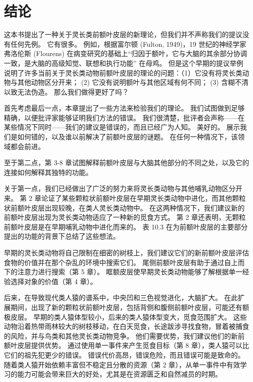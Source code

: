 \section{结论}
这本书提出了一种关于灵长类前额叶皮层的新理论，但我们并不声称我们的提议没有任何先例。 它有很多。 例如，根据富尔顿 (Fulton, 1949)，19 世纪的神经学家弗洛伦斯 (Flourens) 在病变研究的基础上“归因于额叶，它与大脑的其余部分协调一致，是大脑的高级知觉、联想和执行功能” 在母鸡。 但是这个早期的提议举例说明了许多当前关于灵长类动物前额叶皮层的理论的问题：（1）它没有将灵长类动物与其他动物区分开来； (2) 它没有说明额叶与其他区域有何不同； (3) 含糊不清以致无法伪造。 那么我们做得更好了吗？
\par 
首先考虑最后一点，本章提出了一些方法来检验我们的理论。 我们试图做到足够精确，以便批评家能够证明我们方法的错误。 我们很清楚，批评者会声称——在某些情况下同时——我们的建议是错误的，而且已经广为人知。 美好的。 展示我们是如何错的，以及谁以前解决了前额叶皮层的谜题。 在任何一种情况下，该领域都会前进。
\par 
至于第二点，第 3-8 章试图解释前额叶皮层与大脑其他部分的不同之处，以及它的连接如何解释其独特的功能。
\par 
关于第一点，我们已经做出了广泛的努力来将灵长类动物与其他哺乳动物区分开来。 第 2 章论证了某些颗粒状前额叶皮层在早期灵长类动物中进化，而其他颗粒状前额叶皮层出现较晚，在类人灵长类动物中。 在这两种情况下，我们建议新的前额叶皮层出现为灵长类动物适应了一种新的觅食方式。 第 2 章还表明，无颗粒前额叶皮层是在早期哺乳动物中进化而来的。 表 10.3 在为前额叶皮层的主要部分提出的功能的背景下总结了这些想法。
\par 
早期的灵长类动物将自己限制在细密的树枝上，我们建议它们的新前额叶皮层评估食物的价值并在那个杂乱的环境中搜索它们。 尾侧前额叶皮层有助于通过自上而下的注意力进行搜索（第 5 章）。 眶额皮层使早期灵长类动物能够了解根据单一经验选择对象的价值（第 4 章）。
\par 
后来，在导致现代类人猿的谱系中，中央凹和三色视觉进化，大脑扩大。 在此扩展期间，出现了新的颗粒状前额叶皮层，包括背侧和腹侧前额叶皮层，可能还有额极皮层。 早期的类人猿体型较小，后来的类人猿体型变大，觅食范围扩大。 这些动物沿着热带雨林较大的树枝移动，在白天觅食，长途跋涉寻找食物，冒着被捕食的风险，并与鸟类和其他灵长类动物竞争。 他们需要优势，我们建议他们的新前额叶皮层提供优势。 通过使用单一事件来产生觅食目标（第 8 章），类人猿可以比它们的祖先犯更少的错误。 错误代价高昂，错误危险，而且错误可能是致命的。 随着类人猿开始依赖丰富但不稳定且分散的资源（第 2 章），从单一事件中有效学习的能力可能会带来巨大的好处，尤其是在资源匮乏和自然减员的时期。
\par 
